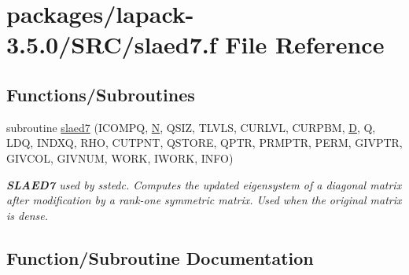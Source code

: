 \hypertarget{slaed7_8f}{}\section{packages/lapack-\/3.5.0/\+S\+R\+C/slaed7.f File Reference}
\label{slaed7_8f}
\subsection*{Functions/\+Subroutines}
\begin{DoxyCompactItemize}
\item 
subroutine \hyperlink{slaed7_8f_aa82b498880b501e765256dcabb001dd8}{slaed7} (I\+C\+O\+M\+P\+Q, \hyperlink{polmisc_8c_a0240ac851181b84ac374872dc5434ee4}{N}, Q\+S\+I\+Z, T\+L\+V\+L\+S, C\+U\+R\+L\+V\+L, C\+U\+R\+P\+B\+M, \hyperlink{odrpack_8h_a7dae6ea403d00f3687f24a874e67d139}{D}, Q, L\+D\+Q, I\+N\+D\+X\+Q, R\+H\+O, C\+U\+T\+P\+N\+T, Q\+S\+T\+O\+R\+E, Q\+P\+T\+R, P\+R\+M\+P\+T\+R, P\+E\+R\+M, G\+I\+V\+P\+T\+R, G\+I\+V\+C\+O\+L, G\+I\+V\+N\+U\+M, W\+O\+R\+K, I\+W\+O\+R\+K, I\+N\+F\+O)
\begin{DoxyCompactList}\small\item\em {\bfseries S\+L\+A\+E\+D7} used by sstedc. Computes the updated eigensystem of a diagonal matrix after modification by a rank-\/one symmetric matrix. Used when the original matrix is dense. \end{DoxyCompactList}\end{DoxyCompactItemize}


\subsection{Function/\+Subroutine Documentation}
\hypertarget{slaed7_8f_aa82b498880b501e765256dcabb001dd8}{}
